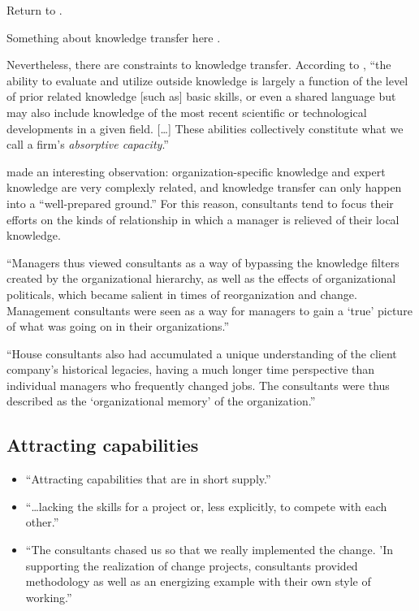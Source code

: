\documentclass[12pt]{article}
\providecommand{\tightlist}{%
  \setlength{\itemsep}{0pt}\setlength{\parskip}{0pt}}
\begin{document}
Return to \citet{turner1982}.

Something about knowledge transfer here \citep{sturdy2009}.

Nevertheless, there are constraints to knowledge transfer. According to
\citet[128-129]{cohen1990}, ``the ability to evaluate and utilize
outside knowledge is largely a function of the level of prior related
knowledge {[}such as{]} basic skills, or even a shared language but may
also include knowledge of the most recent scientific or technological
developments in a given field. {[}\ldots{]} These abilities collectively
constitute what we call a firm's \emph{absorptive capacity}.''

\citet[84]{fincham2002} made an interesting observation:
organization-specific knowledge and expert knowledge are very complexly
related, and knowledge transfer can only happen into a ``well-prepared
ground.'' For this reason, consultants tend to focus their efforts on
the kinds of relationship in which a manager is relieved of their local
knowledge.

``Managers thus viewed consultants as a way of bypassing the knowledge
filters created by the organizational hierarchy, as well as the effects
of organizational politicals, which became salient in times of
reorganization and change. Management consultants were seen as a way for
managers to gain a `true' picture of what was going on in their
organizations.'' \citep[ 54]{werr2002}

``House consultants also had accumulated a unique understanding of the
client company's historical legacies, having a much longer time
perspective than individual managers who frequently changed jobs. The
consultants were thus described as the `organizational memory' of the
organization.''

\hypertarget{attracting-capabilities}{%
\subsection{Attracting capabilities}\label{attracting-capabilities}}

\begin{itemize}
\tightlist
\item
  ``Attracting capabilities that are in short supply.''
  \citet[52]{aubert1996}
\item
  ``\ldots lacking the skills for a project or, less explicitly, to
  compete with each other.'' \citep[ 233]{sturdy1998}
\item
  ``The consultants chased us so that we really implemented the change.
  'In supporting the realization of change projects, consultants
  provided methodology as well as an energizing example with their own
  style of working.'' \citep[ 54]{werr2002}
\end{itemize}
\end{document}
